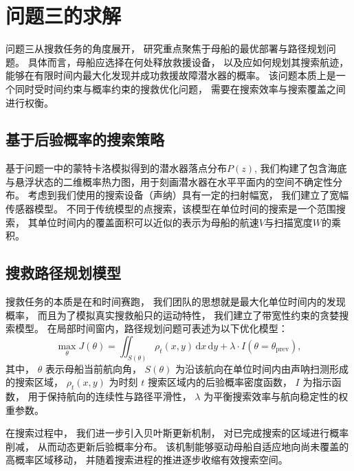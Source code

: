 \documentclass{mcmthesis}
\begin{document}
\section{问题三的求解}
问题三从搜救任务的角度展开，
研究重点聚焦于母船的最优部署与路径规划问题。
具体而言，母船应选择在何处释放救援设备，
以及应如何规划其搜索航迹，
能够在有限时间内最大化发现并成功救援故障潜水器的概率。
该问题本质上是一个同时受时间约束与概率约束的搜救优化问题，
需要在搜索效率与搜索覆盖之间进行权衡。
\subsection{基于后验概率的搜索策略}
基于问题一中的蒙特卡洛模拟得到的潜水器落点分布$P(z)$,
我们构建了包含海底与悬浮状态的二维概率热力图，用于刻画潜水器在水平平面内的空间不确定性分布。
考虑到我们使用的搜索设备（声纳）具有一定的扫射幅宽，
我们建立了宽幅传感器模型。
不同于传统模型的点搜索，该模型在单位时间的搜索是一个范围搜索，
其单位时间内的覆盖面积可以近似的表示为母船的航速$V$与扫描宽度$W$的乘积。
\subsection{搜救路径规划模型}
搜救任务的本质是在和时间赛跑，
我们团队的思想就是最大化单位时间内的发现概率，
而且为了模拟真实搜救船只的运动特性，
我们建立了带宽性约束的贪婪搜索模型。
在局部时间窗内，路径规划问题可表述为以下优化模型：
\begin{equation}
  \max_{\theta} J(\theta)
  =
  \iint_{S(\theta)} \rho_t(x,y)\,\mathrm{d}x\,\mathrm{d}y
  +
  \lambda \cdot I(\theta = \theta_{\mathrm{prev}}),
\end{equation}
其中，
$\theta$ 表示母船当前航向角，
$S(\theta)$ 为沿该航向在单位时间内由声呐扫测形成的搜索区域，
$\rho_t(x,y)$ 为时刻 $t$ 搜索区域内的后验概率密度函数，
$I$ 为指示函数，
用于保持航向的连续性与路径平滑性，
$\lambda$ 为平衡搜索效率与航向稳定性的权重参数。

在搜索过程中，
我们进一步引入贝叶斯更新机制，
对已完成搜索的区域进行概率削减，
从而动态更新后验概率分布。
该机制能够驱动母船自适应地向尚未覆盖的高概率区域移动，
并随着搜索进程的推进逐步收缩有效搜索空间。
\end{document}

